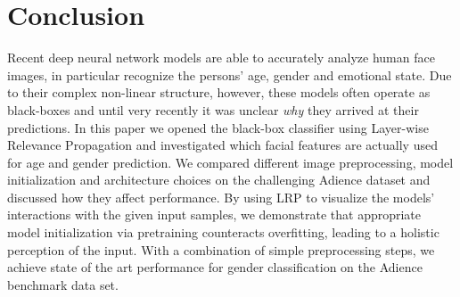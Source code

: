 \documentclass[10pt,twocolumn,letterpaper]{article}
\begin{document}
\section{Conclusion}
Recent deep neural network models are able to accurately analyze human face images, in particular recognize the persons' age, gender and emotional state.
Due to their complex non-linear structure, however, these models often operate as black-boxes and until very recently it was unclear {\it why} they arrived at their predictions.
In this paper we opened the black-box classifier using Layer-wise Relevance Propagation and investigated which facial features are actually used for age and gender prediction.
We compared different image preprocessing, model initialization and architecture choices on the challenging Adience dataset and discussed how they affect performance.
By using LRP to visualize the models' interactions with the given input samples, we demonstrate that appropriate model initialization via pretraining counteracts overfitting, leading to a holistic perception of the input.
With a combination of simple preprocessing steps, we achieve state of the art performance for gender classification on the Adience benchmark data set.

{\small


}
\end{document}

